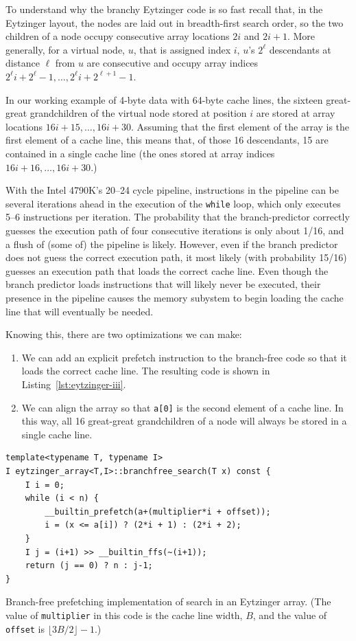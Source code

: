 \documentclass{patmorin}
\newcommand{\lstlabel}[1]{\label{lst:#1}}
\newcommand{\lstref}[1]{Listing~\ref{lst:#1}}
\begin{document}
To understand why the branchy Eytzinger code is so fast recall that,
in the Eytzinger layout, the nodes are laid out in breadth-first
search order,  so the two children of a node occupy consecutive array
locations $2i$ and $2i+1$. More generally, for a virtual node, $u$,
that is assigned index $i$, $u$'s $2^\ell$ descendants at distance
$\ell$ from $u$ are consecutive and occupy array indices $2^\ell i +
2^{\ell}-1,\ldots,2^{\ell} i + 2^{\ell+1}-1$.

In our working example of 4-byte data with 64-byte cache lines, the
sixteen great-great grandchildren of the virtual node stored at position
$i$ are stored at array locations $16i+15,\ldots,16i+30$.  Assuming that
the first element of the array is the first element of a cache line,
this means that, of those 16 descendants, 15 are contained in a single
cache line (the ones stored at array indices $16i+16,\ldots,16i+30$.)

With the Intel 4790K's 20--24 cycle pipeline, instructions in
the pipeline can be several iterations ahead in the execution of the
\texttt{while} loop, which only executes 5--6 instructions per
iteration.  The probability that the branch-predictor correctly guesses
the execution path of four consecutive iterations is only about 1/16,
and a flush of (some of) the pipeline is likely.  However, even if the
branch predictor does not guess the correct execution path, it most likely
(with probability 15/16) guesses an execution path that loads the correct
cache line.  Even though the branch predictor loads instructions that will
likely never be executed, their presence in the pipeline causes the memory
subystem to begin loading the cache line that will eventually be needed.

Knowing this, there are two optimizations we can make:
\begin{enumerate}
  \item We can add an explicit prefetch instruction to the branch-free code
    so that it loads the correct cache line.  The resulting code is shown
    in \lstref{eytzinger-iii}.

  \item We can align the array so that \texttt{a[0]} is the
    second element of a cache line.  In this way, all 16 great-great
    grandchildren of a node will always be stored in a single cache line.
\end{enumerate}

\begin{listing}
\begin{verbatim}
template<typename T, typename I>
I eytzinger_array<T,I>::branchfree_search(T x) const {
    I i = 0;
    while (i < n) {
        __builtin_prefetch(a+(multiplier*i + offset));
        i = (x <= a[i]) ? (2*i + 1) : (2*i + 2);
    }
    I j = (i+1) >> __builtin_ffs(~(i+1));
    return (j == 0) ? n : j-1;
}
\end{verbatim}
\caption{Branch-free prefetching implementation of search in an
         Eytzinger array. (The value of \texttt{multiplier}
         in this code is the cache line width, $B$, and the value of
         \texttt{offset} is $\lfloor3B/2\rfloor-1$.)}
\lstlabel{eytzinger-iii}
\end{listing}
\end{document}
